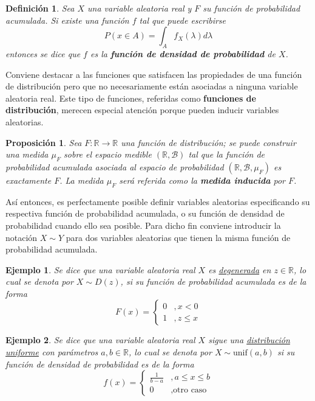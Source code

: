 \documentclass[12pt,letterpaper]{book}
\newtheorem{definicion}{Definición}[chapter]
\newtheorem{proposicion}[teorema]{Proposición}
\newtheorem{ejemplo}{Ejemplo}[chapter]
\newcommand{\R}{\mathbb{R}}
\begin{document}
\begin{definicion}
Sea $X$ una variable aleatoria real y $F$ su función de probabilidad acumulada. Si existe una función $f$  tal que puede escribirse
\begin{equation}
P(x\in A) = \int_A f_X(\lambda) d\lambda 
\end{equation}
entonces se dice que $f$ es la \textbf{función de densidad de probabilidad} de $X$.
\end{definicion}

Conviene destacar a las funciones que satisfacen las propiedades de una función de distribución pero que no necesariamente están asociadas a ninguna variable aleatoria real.
%
Este tipo de funciones, referidas como \textbf{funciones de distribución}, merecen especial atención porque pueden inducir variables aleatorias.

\begin{proposicion}
Sea $F:\R \rightarrow \R$ una función de distribución; se puede construir una medida $\mu_F$ sobre el espacio medible $(\R, \mathcal{B})$ tal que la función de probabilidad acumulada asociada al espacio de probabilidad $(\R, \mathcal{B}, \mu_F)$ es exactamente $F$.
%
La medida $\mu_F$ será referida como la \textbf{medida inducida} por $F$.
\end{proposicion}

Así entonces, es perfectamente posible definir variables aleatorias especificando su respectiva función de probabilidad acumulada, o su función de densidad de probabilidad cuando ello sea posible.
%
Para dicho fin conviene introducir la notación $X \sim Y$ para dos variables aleatorias que tienen la misma función de probabilidad acumulada.

\begin{ejemplo}
Se dice que una variable aleatoria real $X$ es \ul{degenerada} en $z\in \R$, lo cual se denota por $X\sim D(z)$, si su función de probabilidad acumulada es de la forma
\begin{equation}
F(x) = \begin{cases}
0 &, x < 0 \\
1 &, z \leq x
\end{cases}
\end{equation}
\end{ejemplo}

\begin{ejemplo}
Se dice que una variable aleatoria real $X$ sigue una \ul{distribuci\'on uniforme} con parámetros $a, b \in \R$, lo cual se denota por $X\sim \text{unif}(a,b)$ si su función de densidad de probabilidad es de la forma
\begin{equation}
f(x) = 
\begin{cases}
\frac{1}{b-a} &, a\leq x \leq b \\
0 &, \text{otro caso}
\end{cases}
\end{equation}
\end{ejemplo}
\end{document}
